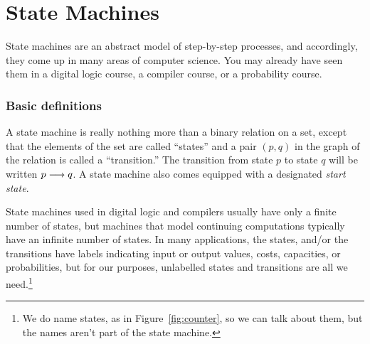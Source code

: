 \chapter{State Machines}\label{state_machine_chap}

\providecommand{\boys}{\text{the-Boys}}
\providecommand{\girls}{\text{the-Girls}}
\providecommand{\qst}{\text{$q_0$}}
\providecommand{\none}{\texttt{none}}
\providecommand{\girln}{\text{$\girls \union \set{\none}$}}
\providecommand{\boyn}{\text{$\boys \union \set{\none}$}}
\providecommand{\sere}{\text{\emph{serenading}}}
\providecommand{\suit}{\text{\emph{suitors}}}
\providecommand{\fav}{\text{\emph{favorite}}}
\providecommand{\nex}{\text{\emph{next}}}
\providecommand{\tgn}{\text{\emph{total-girls-names}}}

\label{state_machine_sec}

State machines are an abstract model of step-by-step processes, and
accordingly, they come up in many areas of computer science.  You may
already have seen them in a digital logic course, a compiler course, or a
probability course.

\subsection{Basic definitions}

A state machine is really nothing more than a binary relation on a set,
except that the elements of the set are called ``states'' and a pair
$(p,q)$ in the graph of the relation is called a ``transition.''  The
transition from state $p$ to state $q$ will be written $p \mathrel{\longrightarrow} q$.
A state machine also comes equipped with a designated \emph{start state}.

State machines used in digital logic and compilers usually have only a
finite number of states, but machines that model continuing computations
typically have an infinite number of states.  In many applications, the
states, and/or the transitions have labels indicating input or output
values, costs, capacities, or probabilities, but for our purposes,
unlabelled states and transitions are all we need.\footnote{We do name
states, as in Figure~\ref{fig:counter}, so we can talk about them, but the
names aren't part of the state machine.}


